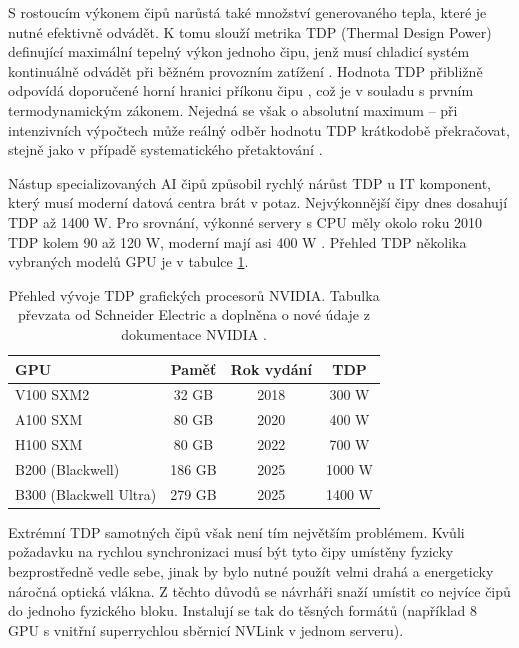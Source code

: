 S rostoucím výkonem čipů narůstá také množství generovaného tepla, které je nutné efektivně odvádět. K tomu slouží metrika TDP (Thermal Design Power) definující maximální tepelný výkon jednoho čipu, jenž musí chladicí systém kontinuálně odvádět při běžném provozním zatížení \cite{mahajan_cooling_2006}. Hodnota TDP přibližně odpovídá doporučené horní hranici příkonu čipu \cite{avelar_ai_2023}, což je v souladu s prvním termodynamickým zákonem. Nejedná se však o absolutní maximum -- při intenzivních výpočtech může reálný odběr hodnotu TDP krátkodobě překračovat, stejně jako v případě systematického přetaktování \cite{noauthor_tdp_nodate}.

Nástup specializovaných AI čipů způsobil rychlý nárůst TDP u IT komponent, který musí moderní datová centra brát v potaz. Nejvýkonnější čipy dnes dosahují TDP až 1400 W. Pro srovnání, výkonné servery s CPU měly okolo roku 2010 TDP kolem 90 až 120 W, moderní mají asi 400 W \cite[s. 3]{bizo_silicon_2022}. Přehled TDP několika vybraných modelů GPU je v tabulce \ref{tab:gpu_tdp}.

\begin{table}[]
    \centering
    \begin{tabular}{|l|c|c|c|} \hline
        \textbf{GPU} & \textbf{Paměť} & \textbf{Rok vydání} & \textbf{TDP} \\ \hline
         V100 SXM2 & 32 GB & 2018 & 300 W \\ \hline
         A100 SXM & 80 GB & 2020 & 400 W \\ \hline
         H100 SXM & 80 GB & 2022 & 700 W \\ \hline
         B200 (Blackwell) & 186 GB & 2025 & 1000 W \\ \hline
         B300 (Blackwell Ultra) & 279 GB & 2025 & 1400 W \\ \hline
    \end{tabular}
    \caption[Přehled vývoje TDP]{Přehled vývoje TDP grafických procesorů NVIDIA. Tabulka převzata od Schneider Electric \cite{avelar_ai_2023} a doplněna o nové údaje z dokumentace NVIDIA \cite{noauthor_nvidia_2025, noauthor_nvidia_2025-1}.}
    \label{tab:gpu_tdp}
\end{table}

Extrémní TDP samotných čipů však není tím největším problémem. Kvůli požadavku na rychlou synchronizaci musí být tyto čipy umístěny fyzicky bezprostředně vedle sebe, jinak by bylo nutné použít velmi drahá \cite[s. 4]{avelar_ai_2023} a energeticky náročná \cite[s. 36]{cruzes_data_2025} optická vlákna. Z těchto důvodů se návrháři snaží umístit co nejvíce čipů do jednoho fyzického bloku. Instalují se tak do těsných formátů (například 8 GPU s vnitřní superrychlou sběrnicí NVLink v jednom serveru). 

